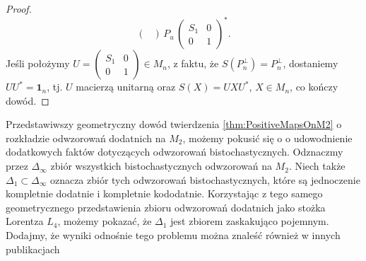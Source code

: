 \begin{proof}
\begin{equation}
\begin{pmatrix}
    \end{pmatrix}
    \, P_{u} \,
    \begin{pmatrix}
    S_{1} & 0 \\ 0 & 1
    \end{pmatrix}^{*}.
\end{equation}
Jeśli położymy $U = \left( \begin{smallmatrix} S_{1} & 0 \\ 0 & 1
\end{smallmatrix} \right) \in M_{n}$,
z faktu, że $S(P_{n}^{\perp}) = P_{n}^{\perp}$,
dostaniemy $U U^{*} = \mathbf{1}_{n}$, tj. $U$ macierzą unitarną oraz
$S(X) = U X U^{*}$, $X \in M_{n}$, co kończy dowód.
\end{proof}

Przedstawiwszy geometryczny dowód twierdzenia \ref{thm:PositiveMapsOnM2}
o rozkładzie odwzorowań dodatnich na $M_{2}$, możemy pokusić się o
o udowodnienie dodatkowych faktów dotyczących odwzorowań bistochastycznych.
Odznaczmy przez $\Delta_{\infty}$ zbiór wszystkich bistochastycznych odwzorowań na
$M_{2}$.
Niech także $\Delta_{1} \subset \Delta_{\infty}$ oznacza zbiór tych odwzorowań
bistochastycznych,
które są jednoczenie kompletnie dodatnie i kompletnie kododatnie.
Korzystając z tego samego geometrycznego przedstawienia zbioru
odwzorowań dodatnich jako stożka Lorentza $L_{4}$,
możemy pokazać, że $\Delta_{1}$ jest zbiorem zaskakująco pojemnym.
Dodajmy, że wyniki odnośnie tego problemu można znaleść również w innych
publikacjach

